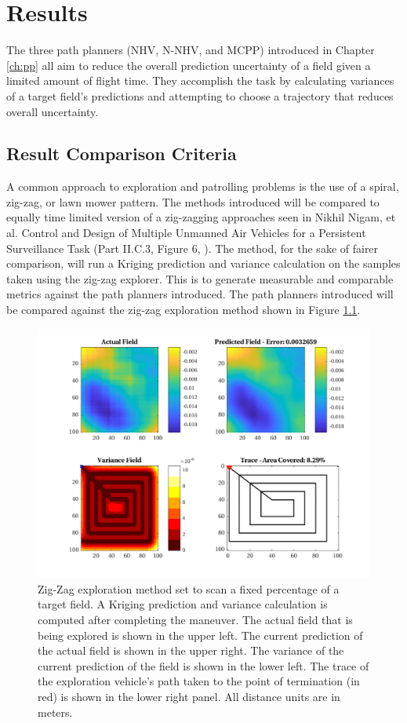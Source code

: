 \chapter{Results}
The three path planners (NHV, N-NHV, and MCPP) introduced in Chapter \ref{ch:pp} all aim to reduce the overall prediction uncertainty of a field given a limited amount of flight time. They accomplish the task by calculating variances of a target field's predictions and attempting to choose a trajectory that reduces overall uncertainty. 

\section{Result Comparison Criteria}
A common approach to exploration and patrolling problems is the use of a spiral, zig-zag, or lawn mower pattern. The methods introduced will be compared to equally time limited version of a zig-zagging approaches seen in Nikhil Nigam, et al. Control and Design of Multiple Unmanned Air Vehicles for a Persistent Surveillance Task (Part II.C.3, Figure 6, \cite{nigam:zigzag}). The method, for the sake of fairer comparison, will run a Kriging prediction and variance calculation on the samples taken using the zig-zag explorer. This is to generate measurable and comparable metrics against the path planners introduced. The path planners introduced will be compared against the zig-zag exploration method shown in Figure \ref{fig:zigzag4}.

\begin{figure}[hbt!]
    \centering
    \includegraphics[width=0.9\linewidth]{figures/hbresults/zz_10p_100x100_sf_25_seed_2.png}
    \captionsetup{skip=0.20\baselineskip,size=footnotesize}
    \caption{Zig-Zag exploration method set to scan a fixed percentage of a target field. A Kriging prediction and variance calculation is computed after completing the maneuver. The actual field that is being explored is shown in the upper left. The current prediction of the actual field is shown in the upper right. The variance of the current prediction of the field is shown in the lower left. The trace of the exploration vehicle's path taken to the point of termination (in red) is shown in the lower right panel. All distance units are in meters.}
    \label{fig:zigzag4}
\end{figure}

